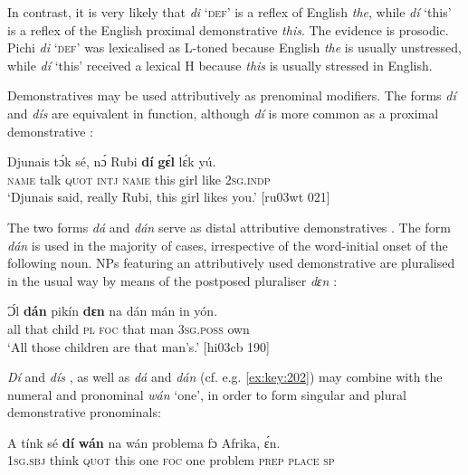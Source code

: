 In contrast, it is very likely that \textit{di} ‘\textsc{def}’ is a reflex of English \textit{the}, while \textit{dí} ‘this’ is a reflex of the English proximal demonstrative \textit{this}. The evidence is prosodic. Pichi \textit{di} ‘\textsc{def}’ was lexicalised as L-toned because English \textit{the} is usually unstressed, while \textit{dí} ‘this’ received a lexical H because \textit{this} is usually stressed in English. 



Demonstratives may be used attributively as prenominal modifiers. The forms \textit{dí} and \textit{dís} are equivalent in function, although \textit{dí} is more common as a proximal demonstrative :



\ea%
    \label{ex:key:192}
    \gll Djunais  tɔ́k  sé,    nɔ́  Rubi    \textbf{dí}  \textbf{gɛ́l}  lɛ́k  yú.\\
\textsc{name}  talk  \textsc{quot}    \textsc{intj}  \textsc{name}  this  girl  like  \textsc{2sg.indp}\\

\glt ‘Djunais said, really Rubi, this girl likes you.’ [ru03wt 021]
\z

The two forms \textit{dá} and \textit{dán} serve as distal attributive demonstratives . The form \textit{dán} is used in the majority of cases, irrespective of the word-initial onset of the following noun. NPs featuring an attributively used demonstrative are pluralised in the usual way by means of the postposed pluraliser \textit{dɛn} :


\ea%
    \label{ex:key:193}
    \gll Ɔ́l  \textbf{dán}  pikín  \textbf{dɛn}  na  dán  mán    in    yón.\\
all  that  child  \textsc{pl}  \textsc{foc}  that  man    \textsc{3sg.poss}  own\\

\glt ‘All those children are that man’s.’ [hi03cb 190]
\z

\textit{Dí} and \textit{dís} , as well as \textit{dá} and \textit{dán} (cf. e.g. \ref{ex:key:202}) may combine with the numeral and pronominal \textit{wán} ‘one’, in order to form singular  and plural  demonstrative pronominals:


\ea%
    \label{ex:key:194}
    \gll A    tínk    sé    \textbf{dí}  \textbf{wán}  na  wán  problema  fɔ  Afrika,  ɛ́n.\\
\textsc{1sg.sbj}  think  \textsc{quot}    this  one  \textsc{foc}  one  problem    \textsc{prep}  \textsc{place}  \textsc{sp}\\

